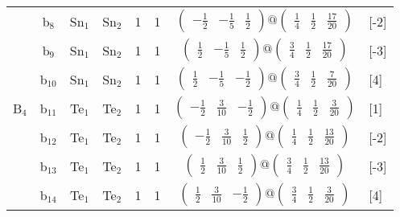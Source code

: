\documentclass[fleqn,10pt,landscape]{article}
\begin{document}
\begin{itemize}
\begin{center}
\begin{longtable}{cc|cc|c|c|c|l}
& b$_{8}$ & Sn$_{1}$ & Sn$_{2}$ & 1 & 1 & $\begin{pmatrix} - \frac{1}{2} & - \frac{1}{5} & \frac{1}{2} \end{pmatrix}@\begin{pmatrix} \frac{1}{4} & \frac{1}{2} & \frac{17}{20} \end{pmatrix}$ & [-2] \\
& b$_{9}$ & Sn$_{1}$ & Sn$_{2}$ & 1 & 1 & $\begin{pmatrix} \frac{1}{2} & - \frac{1}{5} & \frac{1}{2} \end{pmatrix}@\begin{pmatrix} \frac{3}{4} & \frac{1}{2} & \frac{17}{20} \end{pmatrix}$ & [-3] \\
& b$_{10}$ & Sn$_{1}$ & Sn$_{2}$ & 1 & 1 & $\begin{pmatrix} \frac{1}{2} & - \frac{1}{5} & - \frac{1}{2} \end{pmatrix}@\begin{pmatrix} \frac{3}{4} & \frac{1}{2} & \frac{7}{20} \end{pmatrix}$ & [4] \\ \hline
B$_{4}$ & b$_{11}$ & Te$_{1}$ & Te$_{2}$ & 1 & 1 & $\begin{pmatrix} - \frac{1}{2} & \frac{3}{10} & - \frac{1}{2} \end{pmatrix}@\begin{pmatrix} \frac{1}{4} & \frac{1}{2} & \frac{3}{20} \end{pmatrix}$ & [1] \\
& b$_{12}$ & Te$_{1}$ & Te$_{2}$ & 1 & 1 & $\begin{pmatrix} - \frac{1}{2} & \frac{3}{10} & \frac{1}{2} \end{pmatrix}@\begin{pmatrix} \frac{1}{4} & \frac{1}{2} & \frac{13}{20} \end{pmatrix}$ & [-2] \\
& b$_{13}$ & Te$_{1}$ & Te$_{2}$ & 1 & 1 & $\begin{pmatrix} \frac{1}{2} & \frac{3}{10} & \frac{1}{2} \end{pmatrix}@\begin{pmatrix} \frac{3}{4} & \frac{1}{2} & \frac{13}{20} \end{pmatrix}$ & [-3] \\
& b$_{14}$ & Te$_{1}$ & Te$_{2}$ & 1 & 1 & $\begin{pmatrix} \frac{1}{2} & \frac{3}{10} & - \frac{1}{2} \end{pmatrix}@\begin{pmatrix} \frac{3}{4} & \frac{1}{2} & \frac{3}{20} \end{pmatrix}$ & [4] \\
\end{longtable}
\end{center}


\end{itemize}
\end{document}

